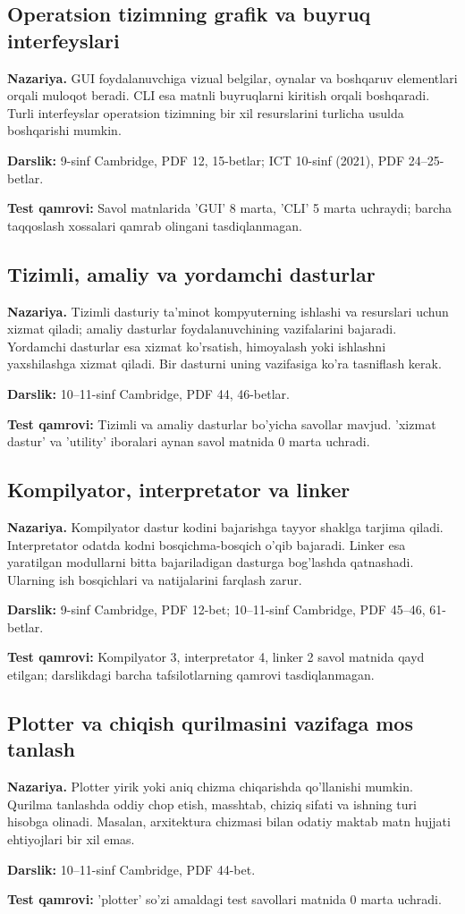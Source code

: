 \documentclass[10pt,a4paper]{article}
\begin{document}
\subsection{Operatsion tizimning grafik va buyruq interfeyslari}
\textbf{Nazariya.} GUI foydalanuvchiga vizual belgilar, oynalar va boshqaruv elementlari orqali muloqot beradi. CLI esa matnli buyruqlarni kiritish orqali boshqaradi. Turli interfeyslar operatsion tizimning bir xil resurslarini turlicha usulda boshqarishi mumkin.
\par\textbf{Darslik:} 9-sinf Cambridge, PDF 12, 15-betlar; ICT 10-sinf (2021), PDF 24--25-betlar.
\par\textbf{Test qamrovi:} Savol matnlarida 'GUI' 8 marta, 'CLI' 5 marta uchraydi; barcha taqqoslash xossalari qamrab olingani tasdiqlanmagan.
\subsection{Tizimli, amaliy va yordamchi dasturlar}
\textbf{Nazariya.} Tizimli dasturiy ta'minot kompyuterning ishlashi va resurslari uchun xizmat qiladi; amaliy dasturlar foydalanuvchining vazifalarini bajaradi. Yordamchi dasturlar esa xizmat ko'rsatish, himoyalash yoki ishlashni yaxshilashga xizmat qiladi. Bir dasturni uning vazifasiga ko'ra tasniflash kerak.
\par\textbf{Darslik:} 10--11-sinf Cambridge, PDF 44, 46-betlar.
\par\textbf{Test qamrovi:} Tizimli va amaliy dasturlar bo'yicha savollar mavjud. 'xizmat dastur' va 'utility' iboralari aynan savol matnida 0 marta uchradi.
\subsection{Kompilyator, interpretator va linker}
\textbf{Nazariya.} Kompilyator dastur kodini bajarishga tayyor shaklga tarjima qiladi. Interpretator odatda kodni bosqichma-bosqich o'qib bajaradi. Linker esa yaratilgan modullarni bitta bajariladigan dasturga bog'lashda qatnashadi. Ularning ish bosqichlari va natijalarini farqlash zarur.
\par\textbf{Darslik:} 9-sinf Cambridge, PDF 12-bet; 10--11-sinf Cambridge, PDF 45--46, 61-betlar.
\par\textbf{Test qamrovi:} Kompilyator 3, interpretator 4, linker 2 savol matnida qayd etilgan; darslikdagi barcha tafsilotlarning qamrovi tasdiqlanmagan.
\subsection{Plotter va chiqish qurilmasini vazifaga mos tanlash}
\textbf{Nazariya.} Plotter yirik yoki aniq chizma chiqarishda qo'llanishi mumkin. Qurilma tanlashda oddiy chop etish, masshtab, chiziq sifati va ishning turi hisobga olinadi. Masalan, arxitektura chizmasi bilan odatiy maktab matn hujjati ehtiyojlari bir xil emas.
\par\textbf{Darslik:} 10--11-sinf Cambridge, PDF 44-bet.
\par\textbf{Test qamrovi:} 'plotter' so'zi amaldagi test savollari matnida 0 marta uchradi.
\end{document}
